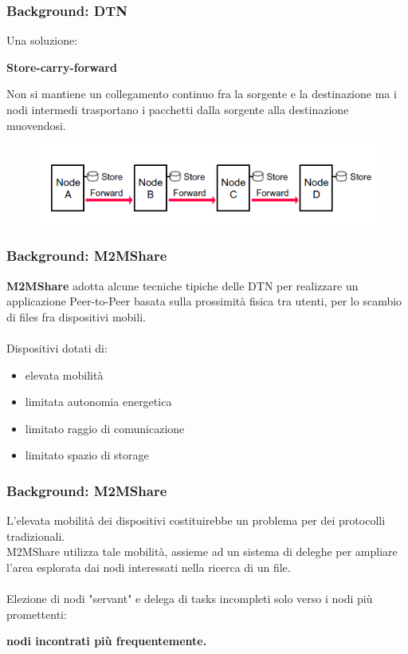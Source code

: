 \documentclass{beamer}
\begin{document}
\begin{frame}
\frametitle{Background: DTN}
Una soluzione:
\ \\
\begin{center}
\textbf{Store-carry-forward}\\
\end{center}

Non si mantiene un collegamento continuo fra la sorgente e la destinazione ma i nodi intermedi trasportano i pacchetti dalla sorgente alla destinazione muovendosi.

\begin{center}
\begin{figure}[ht]
\includegraphics[scale=0.4]{store-and-forward.png}
\end{figure}
\end{center}
\end{frame}




\begin{frame}
\frametitle{Background: M2MShare}
\label{M2MShare}
\textbf{M2MShare} adotta alcune tecniche tipiche delle DTN per realizzare un applicazione Peer-to-Peer basata sulla prossimità fisica tra utenti, per lo scambio di files fra dispositivi mobili.
\ \\
\ \\
\pause 
Dispositivi dotati di:
\begin{itemize}
\item elevata mobilità
\item limitata autonomia energetica
\item limitato raggio di comunicazione
\item limitato spazio di storage
\end{itemize}
\end{frame}

\begin{frame}
\frametitle{Background: M2MShare}
L'elevata mobilità dei dispositivi costituirebbe un problema per dei protocolli tradizionali.\\
M2MShare utilizza tale mobilità, assieme ad un sistema di deleghe per ampliare l'area esplorata dai nodi interessati nella ricerca di un file.
\ \\
\ \\
\pause
Elezione di nodi "servant" e delega di tasks incompleti solo verso i nodi più promettenti: \\
\begin{center}
\textbf{nodi incontrati più frequentemente.}
\end{center}
\end{frame}
\end{document}

